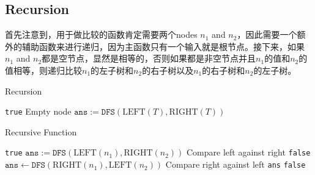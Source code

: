 \subsection{Recursion}
首先注意到，用于做比较的函数肯定需要两个nodes $n_1$ and $n_2$，因此需要一个额外的辅助函数来进行递归，因为主函数只有一个输入就是根节点。接下来，如果$n_1$ and $n_2$都是空节点，显然是相等的，否则如果都是非空节点并且$n_1$的值和$n_2$的值相等，则递归比较$n_1$的左子树和$n_2$的右子树以及$n_1$的右子树和$n_2$的左子树。
\setcounter{algorithm}{0}
\begin{algorithm}[H]
\caption{Recursion}
\begin{algorithmic}[1]
\State \Return \texttt{true} \Comment Empty node
\EndIf
\State $\texttt{ans}:=\texttt{DFS}(\text{LEFT}(T), \text{RIGHT}(T))$
\end{algorithmic}
\end{algorithm}
\begin{algorithm}[H]
\begin{algorithmic}[1]
\EndProcedure
\end{algorithmic}
\end{algorithm}
\begin{algorithm}[H]
\caption{Recursive Function}
\begin{algorithmic}[1]
\State \Return \texttt{true}
\EndIf
{}
\State $\texttt{ans}:= \texttt{DFS}(\text{LEFT}(n_1), \text{RIGHT}(n_2))$ \Comment Compare left against right
\State \Return \texttt{false}
\EndIf
\State $\texttt{ans}\gets \texttt{DFS}(\text{RIGHT}(n_1), \text{LEFT}(n_2))$ \Comment Compare right against left
\State \Return \texttt{ans}
\EndIf
\State \Return \texttt{false}
\EndFunction
\end{algorithmic}
\end{algorithm}
